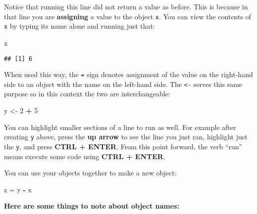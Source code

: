 \documentclass[]{book}
\newenvironment{Shaded}{\begin{snugshade}}{\end{snugshade}}
\newcommand{\DecValTok}[1]{\textcolor[rgb]{0.00,0.00,0.81}{#1}}
\newcommand{\NormalTok}[1]{#1}
\newcommand{\OperatorTok}[1]{\textcolor[rgb]{0.81,0.36,0.00}{\textbf{#1}}}
\newcommand{\StringTok}[1]{\textcolor[rgb]{0.31,0.60,0.02}{#1}}
\begin{document}
Notice that running this line did not return a value as before. This is because in that line you are \textbf{assigning} a value to the object \texttt{x}. You can view the contents of \texttt{x} by typing its name alone and running just that:

\begin{Shaded}
\begin{Highlighting}[]
\NormalTok{x}
\end{Highlighting}
\end{Shaded}

\begin{verbatim}
## [1] 6
\end{verbatim}

When used this way, the \texttt{=} sign denotes assignment of the value on the right-hand side to an object with the name on the left-hand side. The \texttt{\textless{}-} serves this same purpose so in this context the two are interchangeable:

\begin{Shaded}
\begin{Highlighting}[]
\NormalTok{y <-}\StringTok{ }\DecValTok{2} \OperatorTok{+}\StringTok{ }\DecValTok{5}
\end{Highlighting}
\end{Shaded}

You can highlight smaller sections of a line to run as well. For example after creating \texttt{y} above, press the \textbf{up arrow} to see the line you just ran, highlight just the \texttt{y}, and press \textbf{CTRL + ENTER}. From this point forward, the verb ``run'' means execute some code using \textbf{CTRL + ENTER}.

You can use your objects together to make a new object:

\begin{Shaded}
\begin{Highlighting}[]
\NormalTok{z =}\StringTok{ }\NormalTok{y }\OperatorTok{-}\StringTok{ }\NormalTok{x}
\end{Highlighting}
\end{Shaded}

\textbf{Here are some things to note about object names:}
\end{document}
